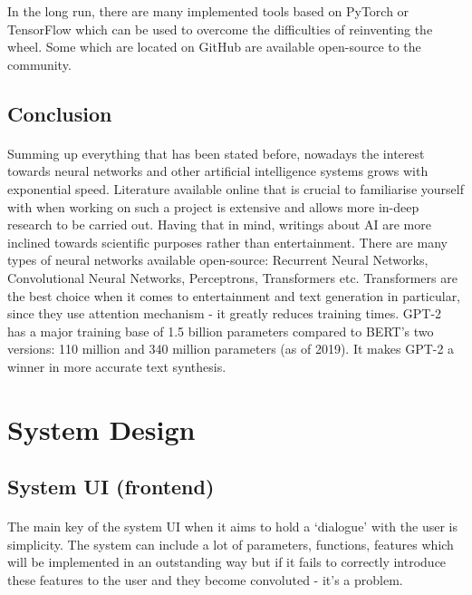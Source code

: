 \documentclass[12pt]{report}
\begin{document}
    In the long run, there are many implemented tools based on PyTorch or TensorFlow which can be used to overcome the difficulties of reinventing the wheel. Some which are located on GitHub are available open-source to the community.

    \subsection*{Conclusion}
    \paragraph{}

    Summing up everything that has been stated before, nowadays the interest towards neural networks and other artificial intelligence systems grows with exponential speed. Literature available online that is crucial to familiarise yourself with when working on such a project is extensive and allows more in-deep research to be carried out. Having that in mind, writings about AI are more inclined towards scientific purposes rather than entertainment.
    There are many types of neural networks available open-source: Recurrent Neural Networks, Convolutional Neural Networks, Perceptrons, Transformers etc. Transformers are the best choice when it comes to entertainment and text generation in particular, since they use attention mechanism - it greatly reduces training times. GPT-2 has a major training base of 1.5 billion parameters compared to BERT's two versions: 110 million and 340 million parameters (as of 2019). It makes GPT-2 a winner in more accurate text synthesis.


    
    \section*{System Design}

    \subsection*{System UI (frontend)}
    \paragraph{}

    The main key of the system UI when it aims to hold a `dialogue' with the user is simplicity. The system can include a lot of parameters, functions, features which will be implemented in an outstanding way but if it fails to correctly introduce these features to the user and they become convoluted - it's a problem.
    
\end{document}
